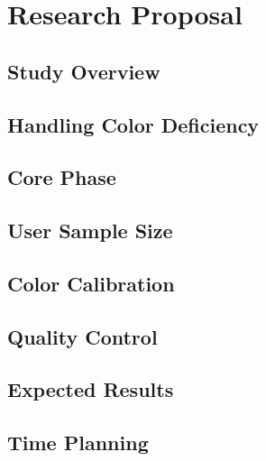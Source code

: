 
\chapter{Research Proposal}
\label{chapter:researchproposal}

\section{Study Overview}
\label{sec:studyoverview}

\section{Handling Color Deficiency}
\label{sec:researchprop_colordeficiency}

\section{Core Phase}
\label{sec:researchprop_corephase}

\section{User Sample Size}
\label{sec:researchprop_samplesize}

\section{Color Calibration}
\label{sec:researchprop_calibration}

\section{Quality Control}
\label{sec:researchprop_qualitycontrol}

\section{Expected Results}
\label{sec:researchprop_expectedresults}

\section{Time Planning}
\label{sec:background_planning}
